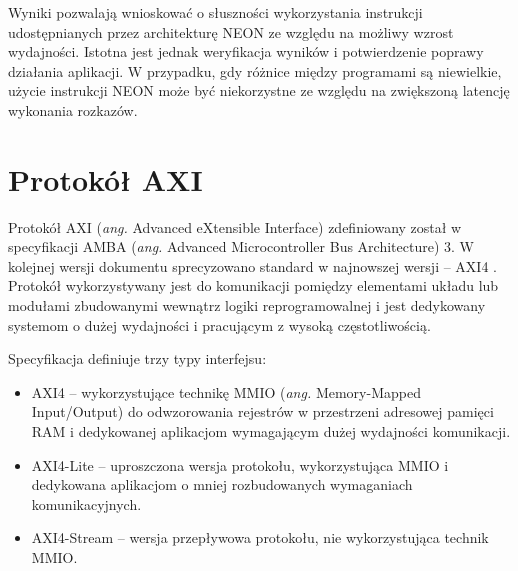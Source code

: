 Wyniki pozwalają wnioskować o słuszności wykorzystania instrukcji udostępnianych przez architekturę NEON ze względu na możliwy wzrost wydajności. Istotna jest jednak weryfikacja wyników i potwierdzenie poprawy działania aplikacji. 
W przypadku, gdy różnice między programami są niewielkie, użycie instrukcji NEON może być niekorzystne ze względu na zwiększoną latencję wykonania rozkazów.


\section{Protokół AXI}
\label{sec:axi-std}

Protokół AXI (\emph{ang.} Advanced eXtensible Interface) zdefiniowany został w specyfikacji AMBA (\emph{ang.} Advanced Microcontroller Bus Architecture) 3. 
W kolejnej wersji dokumentu sprecyzowano standard w najnowszej wersji -- AXI4 \cite{axi-spec}. 
Protokół wykorzystywany jest do komunikacji pomiędzy elementami układu lub modułami zbudowanymi wewnątrz logiki reprogramowalnej i jest dedykowany systemom o dużej wydajności i pracującym z wysoką częstotliwością.

Specyfikacja definiuje trzy typy interfejsu:
\begin{itemize}
	\item AXI4 -- wykorzystujące technikę MMIO (\emph{ang.} Memory-Mapped Input/Output) do odwzorowania rejestrów w przestrzeni adresowej pamięci RAM i dedykowanej aplikacjom wymagającym dużej wydajności komunikacji.
	\item AXI4-Lite -- uproszczona wersja protokołu, wykorzystująca MMIO i dedykowana aplikacjom o mniej rozbudowanych wymaganiach komunikacyjnych.
	\item AXI4-Stream -- wersja przepływowa protokołu, nie wykorzystująca technik MMIO.
\end{itemize}

